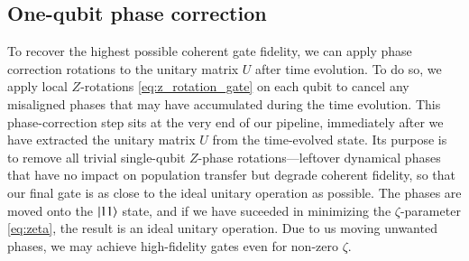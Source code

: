\documentclass{subfiles}
\begin{document}
\subsection{One-qubit phase correction}\label{sec:phase_correction}
To recover the highest possible coherent gate fidelity, we can apply phase correction rotations to the unitary matrix $U$ after time evolution. To do so, we apply local $Z$-rotations \eqref{eq:z_rotation_gate} on each qubit to cancel any misaligned phases that may have accumulated during the time evolution. This phase-correction step sits at the very end of our pipeline, immediately after we have extracted the unitary matrix $U$ from the time-evolved state. Its purpose is to remove all trivial single-qubit $Z$-phase rotations—leftover dynamical phases that have no impact on population transfer but degrade coherent fidelity, so that our final gate is as close to the ideal unitary operation as possible. The phases are moved onto the $\ket{11}$ state, and if we have suceeded in minimizing the $\zeta$-parameter \eqref{eq:zeta}, the result is an ideal unitary operation. Due to us moving unwanted phases, we may achieve high-fidelity gates even for non-zero $\zeta$. 
\end{document}
